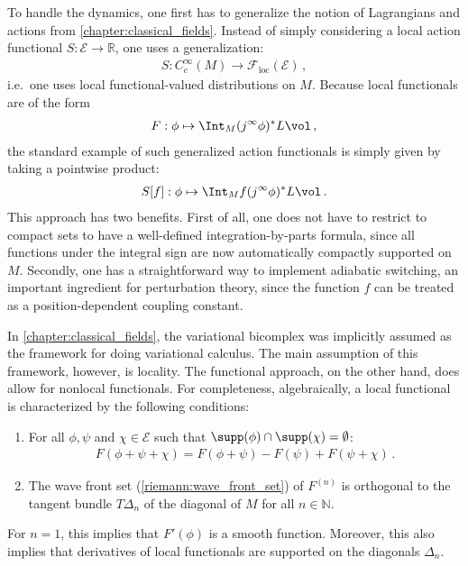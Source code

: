     To handle the dynamics, one first has to generalize the notion of Lagrangians and actions from \cref{chapter:classical_fields}. Instead of simply considering a local action functional $S:\mathcal{E}\rightarrow\mathbb{R}$, one uses a generalization:
    \begin{gather}
        S:C^\infty_c(M)\rightarrow\mathcal{F}_{\text{loc}}(\mathcal{E})\,,
    \end{gather}
    i.e.~one uses local functional-valued distributions on $M$. Because local functionals are of the form
    \begin{gather}
        F:\phi\mapsto\Int_M (j^\infty\phi)^*L\vol\,,
    \end{gather}
    the standard example of such generalized action functionals is simply given by taking a pointwise product:
    \begin{gather}
        S[f]:\phi\mapsto\Int_Mf(j^\infty\phi)^*L\vol\,.
    \end{gather}
    This approach has two benefits. First of all, one does not have to restrict to compact sets to have a well-defined integration-by-parts formula, since all functions under the integral sign are now automatically compactly supported on $M$. Secondly, one has a straightforward way to implement adiabatic switching, an important ingredient for perturbation theory, since the function $f$ can be treated as a position-dependent coupling constant.

    \begin{remark}
        In \cref{chapter:classical_fields}, the variational bicomplex was implicitly assumed as the framework for doing variational calculus. The main assumption of this framework, however, is locality. The functional approach, on the other hand, does allow for nonlocal functionals. For completeness, algebraically, a local functional is characterized by the following conditions:
        \begin{enumerate}
            \item For all $\phi,\psi$ and $\chi\in\mathcal{E}$ such that $\supp(\phi)\cap\supp(\chi)=\emptyset$:
                \begin{gather}
                    F(\phi+\psi+\chi)=F(\phi+\psi)-F(\psi)+F(\psi+\chi)\,.
                \end{gather}
            \item The wave front set (\cref{riemann:wave_front_set}) of $F^{(n)}$ is orthogonal to the tangent bundle $T\Delta_n$ of the diagonal of $M$ for all $n\in\mathbb{N}$.
        \end{enumerate}
        For $n=1$, this implies that $F'(\phi)$ is a smooth function. Moreover, this also implies that derivatives of local functionals are supported on the diagonals $\Delta_n$.
    \end{remark}

